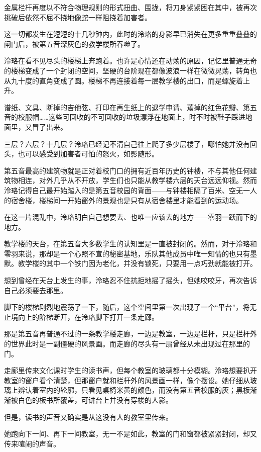 \documentclass[UTF8, scheme = chinese, openany]{ctexbook}
\begin{document}
金属栏杆再度以不符合物理规则的形式扭曲、围拢，将刀身紧紧困在其中，被再次挑破后依然不屈不挠地像蛇一样阻挠着加害者。

这一切都发生在短短的十几秒钟内，此时的泠珞的身影早已消失在更多重重叠叠的闸门后，被第五音深灰色的教学楼所吞噬了。

泠珞在看不见尽头的楼梯上奔跑着。也许是心情还在动荡的原因，记忆里普通无奇的楼梯变成了一个封闭的空间，坚硬的台阶现在都像波浪一样在微微晃荡，转角也从九十度的直角变成了圆。楼梯不再连接着每一层教学楼的出口，而是螺旋着上升。

谱纸、文具、断掉的吉他弦、打印在再生纸上的退学申请、蔫掉的红色花瓣、第五音的校服帽……这些可回收的不可回收的垃圾漂浮在地面上，时不时被鞋子踩进地面里，又冒了出来。

三层？六层？十几层？泠珞已经记不清自己往上爬了多少层楼了，哪怕她并没有回头，也可以感受到加害者可怕的怒火，如影随形。

第五音最高的建筑物就是正对着校门口的拥有近百年历史的钟楼，不与其他任何建筑物相连，对外几乎从不开放，学生们也只能从教学楼六层的天台远远仰视。然而泠珞记得自己最开始踏入的是第五音校园的背面——与钟楼相隔了百米、空无一人的宿舍楼，楼梯间一开始窗外的景观也是只有从宿舍楼里才能看到的运动场。

在这一片混乱中，泠珞明白自己想要去、也唯一应该去的地方——零羽一跃而下的地方。

教学楼的天台，在第五音大多数学生的认知里是一直被封闭的。然而，对于泠珞和零羽来说，那却是一个心照不宣的秘密基地，乐队其他成员中唯一知情的也只有墨默。教学楼的其中一个铁门因为老化，并没有锁死，只要用一点巧劲就能被打开。

想到曾经在天台上发生的事，泠珞忍不住抗拒地摇了摇头，但她咬咬牙，再次告诉自己必须要去那里。

脚下的楼梯剧烈地震荡了一下，随后，这个空间里第一次出现了一个“平台”，将无止境向上的阶梯断开，在泠珞脚下打开一条走廊。

那是第五音再普通不过的一条教学楼走廊，一边是教室，一边是栏杆，只是栏杆外的世界此时是一副僵硬的风景画。而走廊的尽头有一扇曾经从未出现过在那里的门。

走廊里传来文化课时学生的读书声，但每个教室的玻璃都十分模糊。泠珞想要扒开教室的窗户看个清楚，但那窗户就和栏杆外的风景画一样，像个摆设。她仔细从玻璃上辨认着室内的轮廓，只看见桌椅米黄的颜色，而没有第五音校服的灰；黑板渐渐被白色的板书所覆盖，可讲台上并没有穿梭的人影。

但是，读书的声音又确实是从这没有人的教室里传来。

她跑向下一间、再下一间教室，无一不是如此，教室的门和窗都被紧紧封闭，却又传来喧闹的声音。
\end{document}
